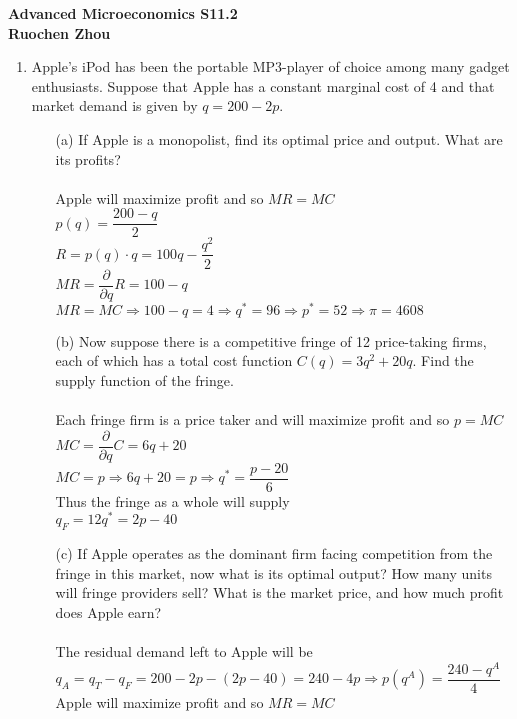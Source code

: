 \documentclass[11pt]{article}
\begin{document}
\begin{center}
\textbf{Advanced Microeconomics S11.2\\}
\textbf{Ruochen Zhou}
\end{center}

\medskip
\begin{enumerate}
\item Apple's iPod has been the portable MP3-player of choice among many gadget enthusiasts. Suppose that Apple has a constant marginal cost of 4 and that market demand is given by $q=200-2p$.
	\begin{itemize}
	\item[(a)] If Apple is a monopolist, find its optimal price and output. What are its profits?\\\\
	Apple will maximize profit and so $MR=MC$\\
	$p(q)=\dfrac{200-q}{2}$\\
	$R=p(q)\cdot q=100q-\dfrac{q^2}{2}$\\
	$MR=\dfrac{\partial}{\partial q}R=100-q$\\
	$MR=MC\Rightarrow100-q=4\Rightarrow q^*=96\Rightarrow p^*=52\Rightarrow\pi=4608$\\
	\item[(b)] Now suppose there is a competitive fringe of 12 price-taking firms, each of which has a total cost function $C(q) = 3q^{2} + 20q$. Find the supply function of the fringe.\\\\
	Each fringe firm is a price taker and will maximize profit and so $p=MC$\\
	$MC=\dfrac{\partial}{\partial q}C=6q+20$\\
	$MC=p\Rightarrow6q+20=p\Rightarrow q^*=\dfrac{p-20}{6}$\\
	Thus the fringe as a whole will supply\\
	$q_F=12q^*=2p-40$\\
	\item[(c)] If Apple operates as the dominant firm facing competition from the fringe in this market, now what is its optimal output? How many units will fringe providers sell? What is the market price, and how much profit does Apple earn?\\\\
	The residual demand left to Apple will be\\
	$q_A=q_T-q_F=200-2p-(2p-40)=240-4p\Rightarrow p(q^A)=\dfrac{240-q^A}{4}$\\
	Apple will maximize profit and so $MR=MC$\\

\end{itemize}
\end{enumerate}
\end{document}
